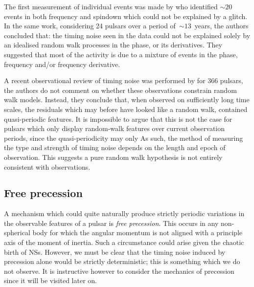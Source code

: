 The first measurement of individual events was made by \citet{Cordes1985} who
identified $\sim20$ events in both frequency and spindown which could not be
explained by a glitch. In the same work, considering 24 pulsars over a period
of~$\sim13$~years, the authors concluded that: the timing noise seen in the
data could not be explained solely by an idealised random walk processes in the
phase, or its derivatives. They suggested that most of the activity is due to a
mixture of events in the phase, frequency and/or frequency derivative.

A recent observational review of timing noise was performed by
\citet{Hobbs2010} for 366 pulsars, the authors do not comment on whether these
observations constrain random walk models. Instead, they conclude that, when
observed on sufficiently long time scales, the residuals which may before have
looked like a random walk, contained quasi-periodic features. It is impossible
to argue that this is not the case for pulsars which only display random-walk
features over current observation periods, since the quasi-periodicity may only
As such, the method of measuring the type and strength of timing noise depends
on the length and epoch of observation. This suggests a pure random walk
hypothesis is not entirely consistent with observations.

\subsection{Free precession}
\label{sec: free precession}

A mechanism which could quite naturally produce strictly periodic variations in the
observable features of a pulsar is \emph{free precession}. This occurs in any
non-spherical body for which the angular momentum is not aligned with a principle
axis of the moment of inertia. Such a circumstance could arise given the
chaotic birth of NSs. However, we must be clear that the timing noise induced by
precession alone would be strictly deterministic; this is something which we do
not observe.
It is instructive however to consider the mechanics of precession since it will
be visited later on.

